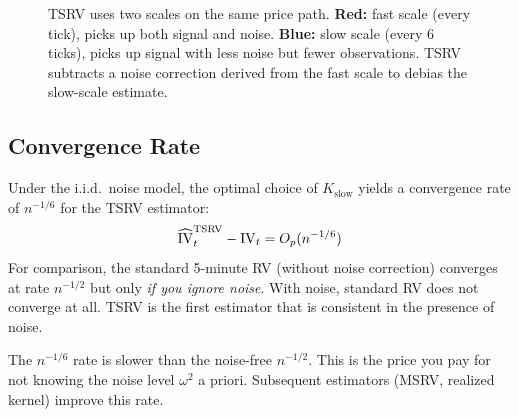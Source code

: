 \begin{figure}[htbp]
\caption{TSRV uses two scales on the same price path.
\textbf{Red:} fast scale (every tick), picks up both signal and noise.
\textbf{Blue:} slow scale (every 6 ticks), picks up signal with less noise but fewer observations.
TSRV subtracts a noise correction derived from the fast scale to debias the slow-scale estimate.}
\label{fig:tsrv-scales}
\end{figure}

\subsection{Convergence Rate}

\begin{keyresult}
Under the i.i.d.\ noise model, the optimal choice of $K_{\text{slow}}$ yields a convergence rate of $n^{-1/6}$ for the TSRV estimator:
\[
  \widehat{\operatorname{IV}}_t^{\text{TSRV}} - \operatorname{IV}_t = O_p(n^{-1/6})
\]
For comparison, the standard 5-minute RV (without noise correction) converges at rate $n^{-1/2}$ but only \emph{if you ignore noise}.
With noise, standard RV does not converge at all.
TSRV is the first estimator that is consistent in the presence of noise.
\end{keyresult}

The $n^{-1/6}$ rate is slower than the noise-free $n^{-1/2}$.
This is the price you pay for not knowing the noise level $\omega^2$ a priori.
Subsequent estimators (MSRV, realized kernel) improve this rate.

